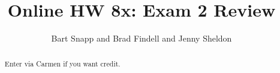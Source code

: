 \documentclass[handout,space,nooutcomes]{xourse}
\title{Online HW 8x: Exam 2 Review}
\author{Bart Snapp and Brad Findell and Jenny Sheldon}
\begin{document}
\begin{abstract}
Enter via Carmen if you want credit.   
\end{abstract}
\maketitle


\end{document}
